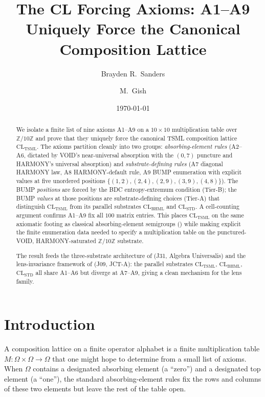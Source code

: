 \documentclass[11pt,reqno]{amsart}
\title[CL Forcing Axioms]
{The CL Forcing Axioms: A1--A9 Uniquely Force the Canonical Composition Lattice}
\author{Brayden R.~Sanders}
\author{M.~Gish}
\date{\today}
\theoremstyle{plain}
\theoremstyle{definition}
\theoremstyle{remark}
\newcommand{\Z}{\mathbb{Z}}
\newcommand{\TSML}{\mathrm{TSML}}
\newcommand{\BHML}{\mathrm{BHML}}
\begin{document}
\begin{abstract}
We isolate a finite list of nine axioms A1--A9 on a $10\times 10$
multiplication table over $\Z/10\Z$ and prove that they uniquely force
the canonical TSML composition lattice $\mathrm{CL}_{\TSML}$. The axioms
partition cleanly into two groups: \emph{absorbing-element rules}
(A2--A6, dictated by VOID's near-universal absorption with the
$(0,7)$ puncture and HARMONY's universal absorption) and
\emph{substrate-defining rules} (A7 diagonal HARMONY law, A8
HARMONY-default rule, A9 BUMP enumeration with explicit values at five
unordered positions $\{(1,2),(2,4),(2,9),(3,9),(4,8)\}$). The BUMP
\emph{positions} are forced by the BDC entropy-extremum condition
(Tier-B); the BUMP \emph{values} at those positions are
substrate-defining choices (Tier-A) that distinguish $\mathrm{CL}_\TSML$
from its parallel substrates $\mathrm{CL}_\BHML$ and $\mathrm{CL}_\mathrm{STD}$.
A cell-counting argument confirms A1--A9 fix all $100$ matrix entries.
This places $\mathrm{CL}_\TSML$ on the same axiomatic footing as
classical absorbing-element semigroups (\cite{HowieSemigroup}) while
making explicit the finite enumeration data needed to specify a
multiplication table on the punctured-VOID, HARMONY-saturated
$\Z/10\Z$ substrate.

The result feeds the three-substrate architecture of
\cite{SandersGishThreeSubstrate} (J31, Algebra Universalis) and the
lens-invariance framework of \cite{SandersLensInvariance}
(J09, JCT-A): the parallel substrates $\mathrm{CL}_\TSML$,
$\mathrm{CL}_\BHML$, $\mathrm{CL}_\mathrm{STD}$ all share A1--A6 but
diverge at A7--A9, giving a clean mechanism for the lens family.
\end{abstract}

\maketitle

\tableofcontents

\section{Introduction}

A composition lattice on a finite operator alphabet is a finite
multiplication table $M : \Omega \times \Omega \to \Omega$ that one
might hope to determine from a small list of axioms. When $\Omega$
contains a designated absorbing element (a ``zero'') and a designated
top element (a ``one''), the standard absorbing-element rules
\cite{HowieSemigroup, Clifford1961} fix the rows and columns of these
two elements but leave the rest of the table open.
\end{document}
